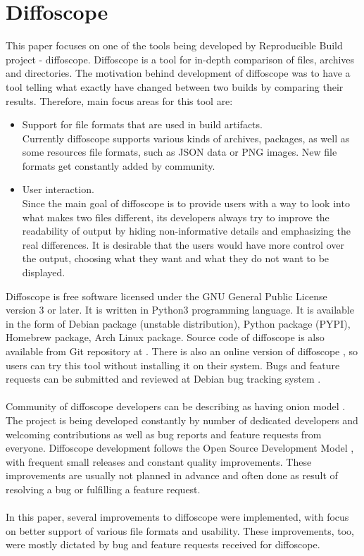 \section{Diffoscope}

This paper focuses on one of the tools being developed by
Reproducible Build project - diffoscope.
Diffoscope is a tool for in-depth comparison of files, archives and
directories\cite{dfs}.
The motivation behind development of diffoscope was to have a tool
telling what exactly have changed between two builds by comparing
their results. Therefore, main focus areas for this tool are:
\begin{itemize}
    \item Support for file formats that are used in build artifacts. \\
    Currently diffoscope supports various kinds of archives, packages,
    as well as some resources file formats, such as JSON data or PNG images.
    New file formats get constantly added by community.
    \item User interaction.\\
    Since the main goal of diffoscope is to provide users with a way to look
    into what makes two files different, its developers always try to
    improve the readability of output by hiding non-informative details and
    emphasizing the real differences. It is desirable that the users would
    have more control over the output, choosing what they want and what they
    do not want to be displayed.
\end{itemize}

Diffoscope is free software licensed under the GNU General Public
License version 3 or later. It is written in Python3 programming language.
It is available in the form of Debian package (unstable distribution),
Python package (PYPI), Homebrew package, Arch Linux package. Source code
of diffoscope is also available from Git repository at \cite{dfs-git}.
There is also an online version of diffoscope \cite{try-dfs}, so users
can try this tool without installing it on their system.
Bugs and feature requests can be submitted and reviewed at Debian
bug tracking system \cite{dfs-bugs}.\\\\
Community of diffoscope developers can be describing as having
onion model \cite{aberdour2007achieving}.
The project is being developed constantly by number of dedicated
developers and welcoming contributions as well as bug reports
and feature requests from everyone.
Diffoscope development follows the Open Source Development Model
\cite{osdm}, with frequent small releases and constant quality improvements.
These improvements are usually not planned in advance and often
done as result of resolving a bug or fulfilling a feature request.\\\\
In this paper, several improvements to diffoscope were implemented,
with focus on better support of various file formats and usability.
These improvements, too, were mostly dictated by bug and feature requests
received for diffoscope.



